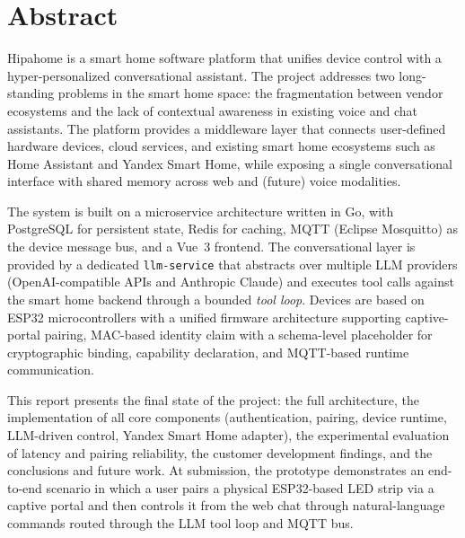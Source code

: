 \documentclass[a4paper,12pt]{article}
\newcommand{\eng}[1]{\textit{#1}}
\begin{document}
\section*{Abstract}

Hipahome is a smart home software platform that unifies device control with a hyper-personalized conversational assistant. The project addresses two long-standing problems in the smart home space: the fragmentation between vendor ecosystems and the lack of contextual awareness in existing voice and chat assistants. The platform provides a middleware layer that connects user-defined hardware devices, cloud services, and existing smart home ecosystems such as Home Assistant and Yandex Smart Home, while exposing a single conversational interface with shared memory across web and (future) voice modalities.

The system is built on a microservice architecture written in Go, with PostgreSQL for persistent state, Redis for caching, MQTT (Eclipse Mosquitto) as the device message bus, and a Vue~3 frontend. The conversational layer is provided by a dedicated \verb|llm-service| that abstracts over multiple LLM providers (OpenAI-compatible APIs and Anthropic Claude) and executes tool calls against the smart home backend through a bounded \eng{tool loop}. Devices are based on ESP32 microcontrollers with a unified firmware architecture supporting captive-portal pairing, MAC-based identity claim with a schema-level placeholder for cryptographic binding, capability declaration, and MQTT-based runtime communication.

This report presents the final state of the project: the full architecture, the implementation of all core components (authentication, pairing, device runtime, LLM-driven control, Yandex Smart Home adapter), the experimental evaluation of latency and pairing reliability, the customer development findings, and the conclusions and future work. At submission, the prototype demonstrates an end-to-end scenario in which a user pairs a physical ESP32-based LED strip via a captive portal and then controls it from the web chat through natural-language commands routed through the LLM tool loop and MQTT bus.

\newpage

\end{document}
